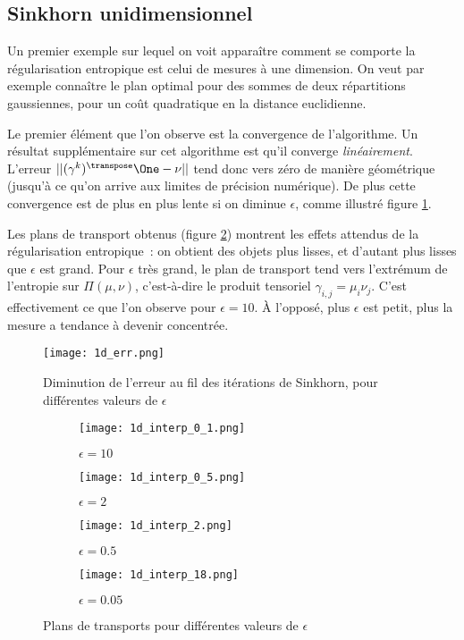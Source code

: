 \subsection{Sinkhorn unidimensionnel}
Un premier exemple sur lequel on voit apparaître comment se comporte la régularisation entropique est celui de mesures à une dimension. On veut par exemple connaître le plan optimal pour des sommes de deux répartitions gaussiennes, pour un coût quadratique en la distance euclidienne.

Le premier élément que l'on observe est la convergence de l'algorithme. Un résultat supplémentaire sur cet algorithme est qu'il converge \emph{linéairement}. L'erreur $|| (\gamma^k)^\transpose \One - \nu ||$ tend donc vers zéro de manière géométrique (jusqu'à ce qu'on arrive aux limites de précision numérique). De plus cette convergence est de plus en plus lente si on diminue $\epsilon$, comme illustré figure \ref{fig:1d_cv}.

Les plans de transport obtenus (figure \ref{fig:1d_maps}) montrent les effets attendus de la régularisation entropique~: on obtient des objets plus lisses, et d'autant plus lisses que $\epsilon$ est grand. Pour $\epsilon$ très grand, le plan de transport tend vers l'extrémum de l'entropie sur $\Pi(\mu,\nu)$, c'est-à-dire le produit tensoriel $\gamma_{i,j} = \mu_i \nu_j$. C'est effectivement ce que l'on observe pour $\epsilon=10$. À l'opposé, plus $\epsilon$ est petit, plus la mesure a tendance à devenir concentrée.

\begin{figure}
\centering
\texttt{[image: 1d\_err.png]}
\caption{Diminution de l'erreur au fil des itérations de Sinkhorn, pour différentes valeurs de $\epsilon$}
\label{fig:1d_cv}
\end{figure}

\begin{figure}
\centering
\begin{subfigure}[b]{5cm}
\texttt{[image: 1d\_interp\_0\_1.png]}
\caption{$\epsilon=10$}
\end{subfigure}
%
\begin{subfigure}[b]{5cm}
\texttt{[image: 1d\_interp\_0\_5.png]}
\caption{$\epsilon=2$}
\end{subfigure}
%
\begin{subfigure}[b]{5cm}
\texttt{[image: 1d\_interp\_2.png]}
\caption{$\epsilon=0.5$}
\end{subfigure}
%
\begin{subfigure}[b]{5cm}
\texttt{[image: 1d\_interp\_18.png]}
\caption{$\epsilon=0.05$}
\end{subfigure}
%
\caption{Plans de transports pour différentes valeurs de $\epsilon$}
\label{fig:1d_maps}
\end{figure}

